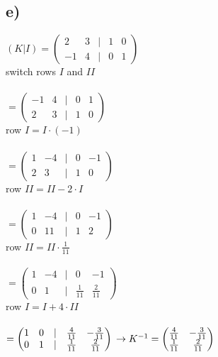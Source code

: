 \subsection*{e)}
$
(K | I) =
\begin{pmatrix}
2 & 3 & | & 1 & 0 \\
-1 & 4 & | & 0 & 1
\end{pmatrix}$\\
switch rows $I$ and $II$\\\\
$=
\begin{pmatrix}
-1 & 4 & | & 0 & 1 \\
2 & 3 & | & 1 & 0
\end{pmatrix}$\\
row $I = I \cdot (-1)$\\\\
$=
\begin{pmatrix}
1 & -4 & | & 0 & -1 \\
2 & 3 & | & 1 & 0
\end{pmatrix}$\\
row $II = II - 2\cdot I$\\\\
$=
\begin{pmatrix}
1 & -4 & | & 0 & -1 \\
0 & 11 & | & 1 & 2
\end{pmatrix}$\\
row $II = II \cdot \frac{1}{11}$\\\\
$=
\begin{pmatrix}
1 & -4 & | & 0 & -1 \\
0 & 1 & | & \frac{1}{11} & \frac{2}{11}
\end{pmatrix}$\\
row $I = I + 4\cdot II$\\\\
$=
\begin{pmatrix}
1 & 0 & | & \frac{4}{11} & -\frac{3}{11} \\
0 & 1 & | & \frac{1}{11} & \frac{2}{11}
\end{pmatrix}\\
\rightarrow K^{-1} = \begin{pmatrix}
\frac{4}{11} & -\frac{3}{11} \\
\frac{1}{11} & \frac{2}{11}
\end{pmatrix}
$\\

